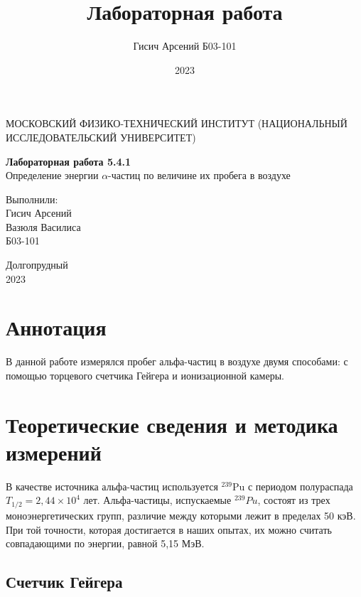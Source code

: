\documentclass[a4paper, 12pt]{article}
\title{Лабораторная работа}
\author{Гисич Арсений Б03-101}
\date{2023}
\begin{document}
	\begin{center}
		{\large МОСКОВСКИЙ ФИЗИКО-ТЕХНИЧЕСКИЙ ИНСТИТУТ (НАЦИОНАЛЬНЫЙ ИССЛЕДОВАТЕЛЬСКИЙ УНИВЕРСИТЕТ)}
	\end{center}
	\vspace{5 cm}
	{\Large
		\begin{center}
			{\bf Лабораторная работа 5.4.1}\\[0.2 cm]
			Определение энергии $\alpha$-частиц по величине их пробега в воздухе
		\end{center}
	}
	\vspace{4 cm}
	\begin{flushright}
		{\Large Выполнили: \\
			\vspace{0.2 cm}
			Гисич Арсений \\
            Вазюля Василиса \\ 
			\vspace{0.2 cm}
			Б03-101 \\}
	\end{flushright}
	\vspace{8 cm}
	\begin{center}
		Долгопрудный\\[0.1 cm]
		2023
	\end{center}
\thispagestyle{empty}

\section{Аннотация}

В данной работе измерялся пробег альфа-частиц в воздухе двумя способами: с помощью торцевого счетчика Гейгера и ионизационной камеры.

\section{Теоретические сведения и методика измерений}

В качестве источника альфа-частиц используется $ ^{239}  $Pu  с периодом полураспада $ T_{1/2} = 2,44 \times 10^4 $ лет. Альфа-частицы, испускаемые $ ^{239} Pu $, состоят из трех моноэнергетических групп, различие между которыми лежит в пределах 50 кэВ. При той точности, которая достигается
	в наших опытах, их можно считать совпадающими по энергии, равной
	5,15 МэВ.
	
	\subsection{Счетчик Гейгера}
	
\end{document}
